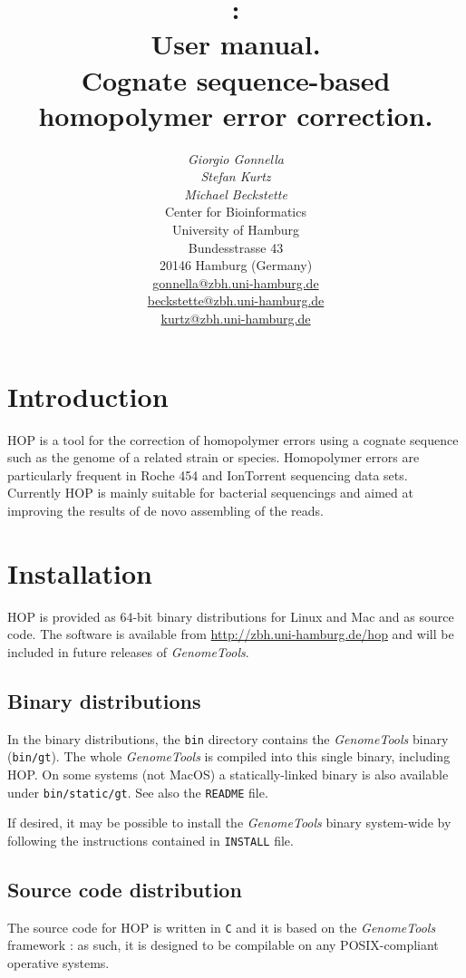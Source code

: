 \documentclass[12pt,titlepage]{article}
\title{\Huge{\Hop 1.0:\\ User manual.}\\[3mm]
\Large{Cognate sequence-based homopolymer error correction.}}
\author{\begin{tabular}{c}
         \textit{Giorgio Gonnella}\\
         \textit{Stefan Kurtz}\\
         \textit{Michael Beckstette}\\[2cm]
         Center for Bioinformatics\\
         University of Hamburg\\
         Bundesstrasse 43\\
         20146 Hamburg (Germany)\\[1cm]
         \url{gonnella@zbh.uni-hamburg.de}\\
         \url{beckstette@zbh.uni-hamburg.de}\\
         \url{kurtz@zbh.uni-hamburg.de}\\[1cm]
        \end{tabular}}
\newcommand{\GenomeTools}{\textit{GenomeTools}\xspace}
\newcommand{\Hop}{{HOP}\xspace}
\begin{document}
\maketitle

\section{Introduction} \label{Introduction}

\Hop \cite{HOP} is a tool for the correction of homopolymer errors using a
cognate sequence such as the genome of a related strain or species.
Homopolymer errors are particularly frequent in
Roche 454 and IonTorrent sequencing data sets. Currently HOP is mainly
suitable for bacterial sequencings and aimed at improving the
results of de novo assembling of the reads.

\section{Installation}

\Hop is provided as 64-bit binary distributions for Linux and Mac and
as source code. The software is available from
\url{http://zbh.uni-hamburg.de/hop} and will be included in
future releases of \GenomeTools.

\subsection{Binary distributions}

In the binary distributions, the \texttt{bin} directory contains the
\GenomeTools binary (\texttt{bin/gt}). The whole \GenomeTools is compiled
into this single binary, including \Hop. On some systems (not MacOS)
a statically-linked binary is also available under \texttt{bin/static/gt}.
See also the \texttt{README} file.

If desired, it may be possible to install the
\GenomeTools binary system-wide by following the instructions contained
in \texttt{INSTALL} file.

\subsection{Source code distribution}

The source code for \Hop is written in \texttt{C} and it is based on
the \GenomeTools framework \cite{genometools}: as such, it is designed to
be compilable on any POSIX-compliant operative systems.
\end{document}
